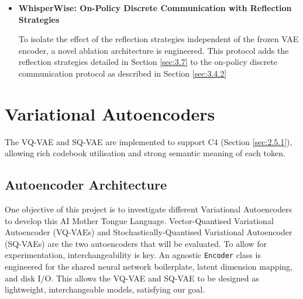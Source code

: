 \begin{itemize}
AI Mother Tongue communication protocol extends Liu's proposed architecture \cite{AIMotherTongue} for this more complex environment.
Figure \ref{fig:ai-mother-tongue-ext} shows my extension to the original AI Mother Tongue (Figure \ref{fig:ai-mother-tongue}).
The agents' observations are split.
The external observations (those which represent the agent's view of the environment) are split from the rest and fed through the frozen encoder and quantiser.
Another key difference is the action head.
Instead of the simple rule Liu implemented, we pass the policy output through an MLP to output a probability distribution over the action space.

\item \textbf{WhisperWise: On-Policy Discrete Communication with Reflection Strategies}
\label{sec:3.4.4}

To isolate the effect of the reflection strategies independent of the frozen VAE encoder, a novel ablation architecture is engineered.
This protocol adds the reflection strategies detailed in Section \ref{sec:3.7} to the on-policy discrete communication protocol as described in Section \ref{sec:3.4.2}

\end{itemize}

\section{Variational Autoencoders}
\label{sec:3.5}

The VQ-VAE and SQ-VAE are implemented to support C4 (Section \ref{sec:2.5.1}), allowing rich codebook utilisation and strong semantic meaning of each token. 

\subsection{Autoencoder Architecture}
\label{sec:3.5.1}

One objective of this project is to investigate different Variational Autoencoders to develop this AI Mother Tongue Language.
Vector-Quantised Variational Autoencoder (VQ-VAEs) and Stochastically-Quantised Variational Autoencoder (SQ-VAEs) are the two autoencoders that will be evaluated.
To allow for experimentation, interchangeability is key.
An agnostic \lstinline[language=Python]|Encoder| class is engineered for the shared neural network boilerplate, latent dimension mapping, and disk I/O.
This allows the VQ-VAE and SQ-VAE to be designed as lightweight, interchangeable models, satisfying our goal.

